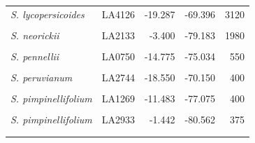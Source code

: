 \documentclass[
  letterpaper,
  DIV=11,
  numbers=noendperiod]{scrartcl}
\begin{document}
\begin{longtable}{>{\raggedright\arraybackslash}p{3.25cm}lrrr}
\em{S. lycopersicoides} & LA4126 & -19.287 & -69.396 & 3120\\
\em{\cellcolor{gray!10}{S. neorickii}} & \cellcolor{gray!10}{LA1322} & \cellcolor{gray!10}{-13.483} & \cellcolor{gray!10}{-72.442} & \cellcolor{gray!10}{2380}\\
\em{S. neorickii} & LA2133 & -3.400 & -79.183 & 1980\\
\addlinespace
\em{\cellcolor{gray!10}{S. pennellii}} & \cellcolor{gray!10}{LA0716} & \cellcolor{gray!10}{-16.225} & \cellcolor{gray!10}{-73.617} & \cellcolor{gray!10}{50}\\
\em{S. pennellii} & LA0750 & -14.775 & -75.034 & 550\\
\em{\cellcolor{gray!10}{S. pennellii}} & \cellcolor{gray!10}{LA3778} & \cellcolor{gray!10}{-14.775} & \cellcolor{gray!10}{-75.034} & \cellcolor{gray!10}{616}\\
\em{S. peruvianum} & LA2744 & -18.550 & -70.150 & 400\\
\em{\cellcolor{gray!10}{S. peruvianum}} & \cellcolor{gray!10}{LA2964} & \cellcolor{gray!10}{-18.028} & \cellcolor{gray!10}{-70.835} & \cellcolor{gray!10}{75}\\
\addlinespace
\em{S. pimpinellifolium} & LA1269 & -11.483 & -77.075 & 400\\
\em{\cellcolor{gray!10}{S. pimpinellifolium}} & \cellcolor{gray!10}{LA1589} & \cellcolor{gray!10}{-8.433} & \cellcolor{gray!10}{-78.817} & \cellcolor{gray!10}{30}\\
\em{S. pimpinellifolium} & LA2933 & -1.442 & -80.562 & 375\\
\em{\cellcolor{gray!10}{S. sitiens}} & \cellcolor{gray!10}{LA4116} & \cellcolor{gray!10}{-22.159} & \cellcolor{gray!10}{-68.782} & \cellcolor{gray!10}{2960}\\*

\end{longtable}
\end{document}
